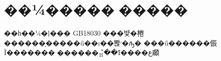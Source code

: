 \chapter{��¼������߽�����}
��һ��¼�ļ��� GB18030 ���뱣�棬������֤�����ű��ı��뽡׳�ԡ�
���ű������侲Ĭ�������󱨸������⣬��Ϊ����ع顣

